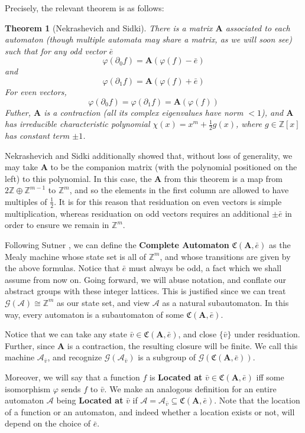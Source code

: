 \documentclass[12pt]{article}
\newcommand{\A}{\mathcal{A}}
\newcommand{\G}{\mathcal{G}}
\newcommand{\C}{\mathfrak{C}(\Am,\e)}
\newcommand{\Z}{\mathbb{Z}}
\newcommand{\2}{\textbf{2}}
\newcommand{\Am}{\textbf{A}}
\newcommand{\del}{\partial}
\renewcommand{\v}{\bar{v}}
\newcommand{\e}{\bar{e}}
\newtheorem{thm}{Theorem}
\begin{document}
Precisely, the relevant theorem is as follows:
\begin{thm}[Nekrashevich and Sidki]
  There is a matrix $\Am$ associated to each automaton 
  (though multiple automata may share a matrix, as we will soon see)
  such that for any odd vector $\e$ 
  \[ \varphi (\del_0 f) = \Am (\varphi(f) - \e) \] and
  \[ \varphi (\del_1 f) = \Am (\varphi(f) + \e) \]
  For even vectors, 
  \[ \varphi (\del_0 f) = \varphi (\del_1 f) = \Am (\varphi(f)) \]
  Futher, $\Am$ is a contraction (all its complex eigenvalues have norm $<1$),
  and $\Am$ has irreducible characteristic polynomial 
  $\chi(x) = x^m + \frac{1}{2}g(x)$, 
  where $g \in \Z[x]$ has constant term $\pm 1$.
\end{thm}

Nekrashevich and Sidki additionally showed that, without loss of generality, 
we may take $\Am$ to be the companion matrix 
(with the polynomial positioned on the left) 
to this polynomial. In this case, the $\Am$ from this theorem is a map from 
$2\Z \oplus \Z^{m-1}$ to $\Z^m$, and so the elements in the first column are
allowed to have multiples of $\frac{1}{2}$. It is for this reason that 
residuation on even vectors is simple multiplication, whereas residuation
on odd vectors requires an additional $\pm \e$ in order to ensure we
remain in $\Z^m$.

Following Sutner \cite{Sutner18:abelian_automata}, 
we can define the \textbf{Complete Automaton} 
$\C$ as the Mealy machine whose state set is all of
$\Z^m$, and whose transitions are given by the above formulas.
Notice that $\e$ must always be odd, a fact which we shall assume from now on.
Going forward, we will abuse notation, and conflate our abstract groups
with these integer lattices. This is justified since we can treat
$\G(\A) \cong \Z^m$ as our state set, and view $\A$ as a natural subautomaton. 
In this way, every automaton is a subautomaton of some $\C$.

Notice that we can take any state $\v \in \C$, 
and close $\{ \v \}$ under residuation.
Further, since $\Am$ is a contraction, the resulting closure will be finite.
We call this machine $\A_{\v}$, and recognize $\G(\A_{\v})$ is a subgroup of 
$\G(\C)$.

Moreover, we will say that a function $f$ is \textbf{Located at} 
$\v \in \C$ iff some isomorphism $\varphi$ sends 
$f$ to $\v$. We make an analogous definition for an entire automaton $\A$
being \textbf{Located at} $\v$ if 
$\A = \A_{\v} \subseteq \C$. Note that the location of a function or an
automaton, and indeed whether a location exists or not, 
will depend on the choice of $\e$.
\end{document}
